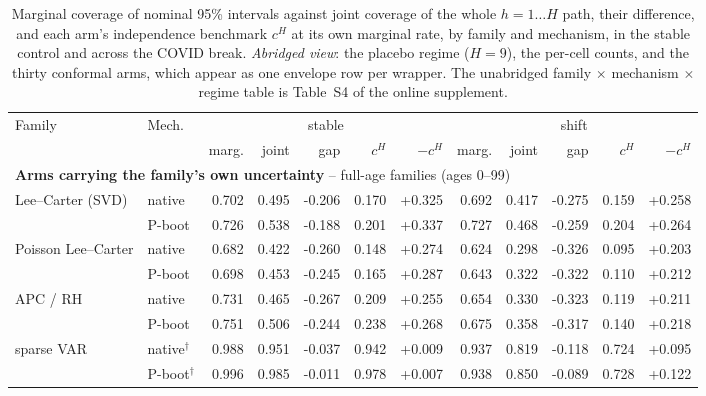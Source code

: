 \begin{table}[tbp]
\centering
\caption{Marginal coverage of nominal 95\% intervals against joint coverage of the whole $h=1\ldots H$ path, their difference, and each arm's independence benchmark $c^{H}$ at its own marginal rate, by family and mechanism, in the stable control and across the COVID break. \emph{Abridged view}: the placebo regime ($H=9$), the per-cell counts, and the thirty conformal arms, which appear as one envelope row per wrapper. The unabridged family $\times$ mechanism $\times$ regime table is Table~S4 of the online supplement.}\label{tab:h3-joint-main}
\begin{threeparttable}\scriptsize\renewcommand{\arraystretch}{0.90}\setlength{\tabcolsep}{2.5pt}
\begin{tabular}{@{}llrrrrrrrrrr@{}}
\toprule
Family & Mech. & \multicolumn{5}{c}{stable} & \multicolumn{5}{c}{shift} \\
 &  & marg. & joint & gap & $c^{H}$ & $-c^{H}$ & marg. & joint & gap & $c^{H}$ & $-c^{H}$ \\
\midrule
\multicolumn{12}{l}{\textbf{Arms carrying the family's own uncertainty} -- full-age families (ages 0--99)} \\
\midrule
Lee--Carter (SVD) & native & 0.702 & 0.495 & -0.206 & 0.170 & +0.325 & 0.692 & 0.417 & -0.275 & 0.159 & +0.258 \\
 & P-boot & 0.726 & 0.538 & -0.188 & 0.201 & +0.337 & 0.727 & 0.468 & -0.259 & 0.204 & +0.264 \\
Poisson Lee--Carter & native & 0.682 & 0.422 & -0.260 & 0.148 & +0.274 & 0.624 & 0.298 & -0.326 & 0.095 & +0.203 \\
 & P-boot & 0.698 & 0.453 & -0.245 & 0.165 & +0.287 & 0.643 & 0.322 & -0.322 & 0.110 & +0.212 \\
APC / RH & native & 0.731 & 0.465 & -0.267 & 0.209 & +0.255 & 0.654 & 0.330 & -0.323 & 0.119 & +0.211 \\
 & P-boot & 0.751 & 0.506 & -0.244 & 0.238 & +0.268 & 0.675 & 0.358 & -0.317 & 0.140 & +0.218 \\
sparse VAR & native$^{\dagger}$ & 0.988 & 0.951 & -0.037 & 0.942 & +0.009 & 0.937 & 0.819 & -0.118 & 0.724 & +0.095 \\
 & P-boot$^{\dagger}$ & 0.996 & 0.985 & -0.011 & 0.978 & +0.007 & 0.938 & 0.850 & -0.089 & 0.728 & +0.122 \\

\end{tabular}
\end{threeparttable}
\end{table}
